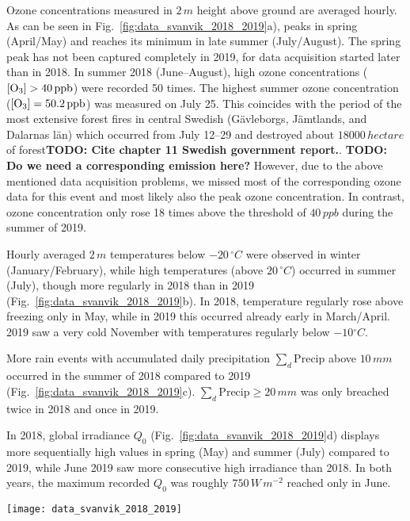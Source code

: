 \documentclass[bg, manuscript]{copernicus}
\begin{document}
Ozone concentrations \chem{[O_3]} measured in $2\,\unit{m}$ height above ground are averaged hourly. As can be seen in Fig.~\ref{fig:data_svanvik_2018_2019}a), \chem{[O_3]} peaks in spring (April/May) and reaches its minimum in late summer (July/August). The spring peak has not been captured completely in 2019, for data acquisition started later than in 2018. In summer 2018 (June--August), high ozone concentrations ($\chem{[O_3]} > 40\,\unit{ppb}$) were recorded 50 times. The highest summer ozone concentration ($\chem{[O_3]} = 50.2\,\unit{ppb}$) was measured on July 25. This coincides with the period of the most extensive forest fires in central Swedish (G\"{a}vleborgs, J\"{a}mtlands, and Dalarnas l\"{a}n) which occurred from July 12--29 and destroyed about $18000\,\unit{hectare}$ of forest{\bf TODO: Cite chapter 11 Swedish government report.}. {\bf TODO: Do we need a corresponding  emission here?} However, due to the above mentioned data acquisition problems, we missed most of the corresponding ozone data for this event and most likely also the peak ozone concentration. In contrast, ozone concentration only rose 18 times above the threshold of $40\,\unit{ppb}$ during the summer of 2019.

Hourly averaged $2\,\unit{m}$ temperatures below $-20\,\unit{^\circ C}$ were observed in winter (January/February), while high temperatures (above $20\,\unit{^\circ C}$) occurred in summer (July), though more regularly in 2018 than in 2019 (Fig.~\ref{fig:data_svanvik_2018_2019}b). In 2018, temperature regularly rose above freezing only in May, while in 2019 this occurred already early in March/April. 2019 saw a very cold November with temperatures regularly below $-10\unit{^\circ C}$.

More rain events with accumulated daily precipitation $\sum_d \mathrm{Precip}$ above $10\,\unit{mm}$ occurred in the summer of 2018 compared to 2019 (Fig.~\ref{fig:data_svanvik_2018_2019}c). $\sum_d \mathrm{Precip} \ge 20\,\unit{mm}$ was only breached twice in 2018 and once in 2019.

In 2018, global irradiance $Q_0$ (Fig.~\ref{fig:data_svanvik_2018_2019}d) displays more sequentially high values in spring (May) and summer (July) compared to 2019, while June 2019 saw more consecutive high irradiance than 2018. In both years, the maximum recorded $Q_0$ was roughly $750\,\unit{W\,m^{-2}}$ reached only in June.

\begin{figure*}[t]
  \texttt{[image: data\_svanvik\_2018\_2019]}
  \caption{Observational data from atmospheric monitoring at Svanhovd in 2018/19. The hatched areas indicate missing ozone monitoring data. (a) Hourly averaged ozone concentration; (b) hourly averaged temperature; (c) daily accumulated precipitation; (d) hourly averaged global irradiance.}
  \label{fig:data_svanvik_2018_2019}
\end{figure*}
\end{document}

